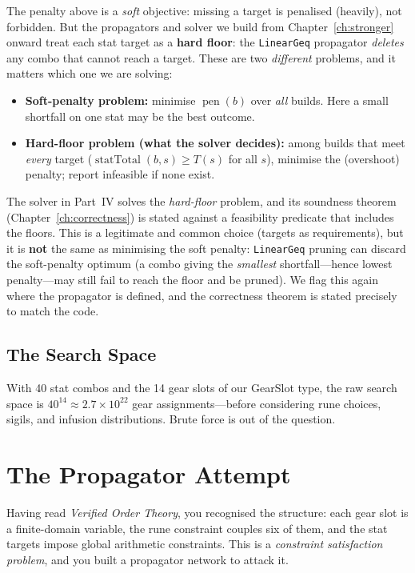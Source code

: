\documentclass[11pt, a4paper, oneside]{book}
\newcommand{\pen}{\operatorname{pen}}
\newcommand{\statTotal}{\operatorname{statTotal}}
\newcommand{\li}[1]{{\ttfamily\small\color{deepblue}#1}}
\begin{document}
\begin{warningbox}[title={Soft objective vs.\ hard floors: a modelling decision}]
The penalty above is a \emph{soft} objective: missing a target is penalised
(heavily), not forbidden.  But the propagators and solver we build from
Chapter~\ref{ch:stronger} onward treat each stat target as a \textbf{hard
floor}: the \texttt{LinearGeq} propagator \emph{deletes} any combo that cannot
reach a target.  These are two \emph{different} problems, and it matters which
one we are solving:
\begin{itemize}[nosep]
  \item \textbf{Soft-penalty problem:} minimise $\pen(b)$ over \emph{all} builds.
    Here a small shortfall on one stat may be the best outcome.
  \item \textbf{Hard-floor problem (what the solver decides):} among builds that
    meet \emph{every} target ($\statTotal(b,s) \geq T(s)$ for all $s$), minimise
    the (overshoot) penalty; report infeasible if none exist.
\end{itemize}
The solver in Part~IV solves the \emph{hard-floor} problem, and its soundness
theorem (Chapter~\ref{ch:correctness}) is stated against a feasibility predicate
that includes the floors.  This is a legitimate and common choice (targets as
requirements), but it is \textbf{not} the same as minimising the soft penalty:
\texttt{LinearGeq} pruning can discard the soft-penalty optimum (a combo giving
the \emph{smallest} shortfall---hence lowest penalty---may still fail to reach
the floor and be pruned).  We flag this again where the propagator is defined,
and the correctness theorem is stated precisely to match the code.
\end{warningbox}

\subsection{The Search Space}

With 40 stat combos and the 14 gear slots of our \li{GearSlot} type, the raw
search space is $40^{14} \approx 2.7 \times 10^{22}$ gear assignments---before
considering rune choices, sigils, and infusion distributions.  Brute force is
out of the question.

\section{The Propagator Attempt}

Having read \emph{Verified Order Theory}, you recognised the structure: each
gear slot is a finite-domain variable, the rune constraint couples six of them,
and the stat targets impose global arithmetic constraints.  This is a
\emph{constraint satisfaction problem}, and you built a propagator network
to attack it.
\end{document}
